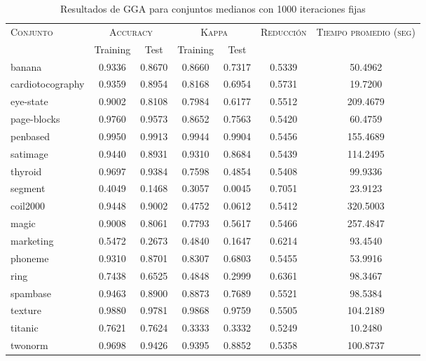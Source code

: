 \begin{table}[]
\centering
\begin{tabular}{l c c c c c c}
\hline
\multirow{2}{*}{\textsc{Conjunto}}
	& \multicolumn{2}{c}{\textsc{Accuracy}}
	& \multicolumn{2}{c}{\textsc{Kappa}}
	& \textsc{Reducción}
	& \textsc{Tiempo promedio (seg)} \\
	& Training & Test
	& Training & Test \\ 
\hline
\hline

banana & 0.9336 & 0.8670 & 0.8660 & 0.7317 & 0.5339 & 50.4962 \\
cardiotocography & 0.9359 & 0.8954 & 0.8168 & 0.6954 & 0.5731 & 19.7200 \\
eye-state & 0.9002 & 0.8108 & 0.7984 & 0.6177 & 0.5512 & 209.4679 \\
page-blocks & 0.9760 & 0.9573 & 0.8652 & 0.7563 & 0.5420 & 60.4759 \\
penbased & 0.9950 & 0.9913 & 0.9944 & 0.9904 & 0.5456 & 155.4689 \\
satimage & 0.9440 & 0.8931 & 0.9310 & 0.8684 & 0.5439 & 114.2495 \\
thyroid & 0.9697 & 0.9384 & 0.7598 & 0.4854 & 0.5408 & 99.9336 \\
segment & 0.4049 & 0.1468 & 0.3057 & 0.0045 & 0.7051 & 23.9123 \\
coil2000 & 0.9448 & 0.9002 & 0.4752 & 0.0612 & 0.5412 & 320.5003 \\
magic & 0.9008 & 0.8061 & 0.7793 & 0.5617 & 0.5466 & 257.4847 \\
marketing & 0.5472 & 0.2673 & 0.4840 & 0.1647 & 0.6214 & 93.4540 \\
phoneme & 0.9310 & 0.8701 & 0.8307 & 0.6803 & 0.5455 & 53.9916 \\
ring & 0.7438 & 0.6525 & 0.4848 & 0.2999 & 0.6361 & 98.3467 \\
spambase & 0.9463 & 0.8900 & 0.8873 & 0.7689 & 0.5521 & 98.5384 \\
texture & 0.9880 & 0.9781 & 0.9868 & 0.9759 & 0.5505 & 104.2189 \\
titanic & 0.7621 & 0.7624 & 0.3333 & 0.3332 & 0.5249 & 10.2480 \\
twonorm & 0.9698 & 0.9426 & 0.9395 & 0.8852 & 0.5358 & 100.8737 \\

\hline
\end{tabular}
\caption{Resultados de GGA para conjuntos medianos con 1000 iteraciones fijas}
\label{res-med-gga}
\end{table}



